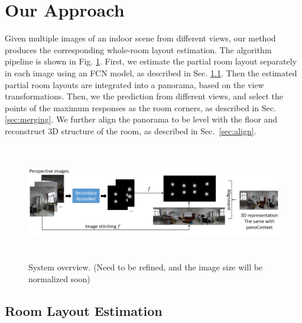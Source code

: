 \section{Our Approach}

Given multiple images of an indoor scene from different views, our method produces the corresponding whole-room layout estimation. 
The algorithm pipeline is shown in Fig. \ref{fig:overview}. 
First, we estimate the partial room layout separately in each image using an FCN model, as described in Sec. \ref{sec:layout}. Then the estimated partial room layouts are integrated into a panorama, based on the view transformations. 
Then, we  the prediction from different views, and select the points of the maximum responses as the room corners, as described in Sec. \ref{sec:merging}. 
We further align the panorama to be level with  the floor and reconstruct 3D structure of the room, as described in Sec.~\ref{sec:align}. 

\begin{figure}
	\includegraphics[height=2in, width=7in]{figs/ppline.png}
	\caption{System overview. (Need to be refined, and the image size will be normalized soon)}
	\label{fig:overview}
\end{figure}

\subsection{Room Layout Estimation}
\label{sec:layout}

